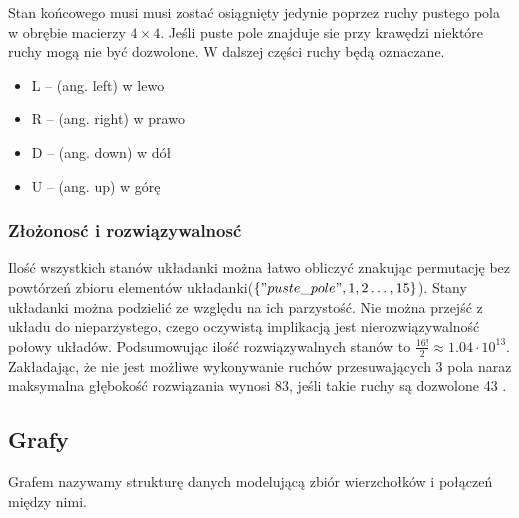 \documentclass{classrep}
\begin{document}
Stan końcowego musi musi zostać osiągnięty jedynie poprzez ruchy pustego pola w obrębie macierzy $4\times 4$. 
Jeśli puste pole znajduje sie przy krawędzi niektóre ruchy mogą nie być dozwolone.
W dalszej części ruchy będą oznaczane.
\begin{itemize}
    \item L -- (ang. left) w lewo
    \item R -- (ang. right) w prawo
    \item D -- (ang. down) w dół
    \item U -- (ang. up) w górę
\end{itemize}
\subsubsection{Złożonosć i rozwiązywalnosć}
Ilość wszystkich stanów układanki można łatwo obliczyć znakując permutację bez powtórzeń zbioru elementów układanki($\{"puste\_pole",1,2\dots,15\}$).
Stany układanki można podzielić ze względu na ich parzystość.
Nie można przejść z układu do nieparzystego, czego oczywistą implikacją jest nierozwiązywalność połowy układów\cite{15parity}.
Podsumowując ilość rozwiązywalnych stanów to $\frac{16!}{2}\approx 1.04\cdot10^{13}$.
Zakładając, że nie jest możliwe wykonywanie ruchów przesuwających 3 pola naraz maksymalna głębokość rozwiązania wynosi 83, jeśli takie ruchy są dozwolone 43 \cite{15in43moves}.

\subsection{Grafy}
Grafem nazywamy strukturę danych modelującą zbiór wierzchołków i połączeń między nimi.
\end{document}
